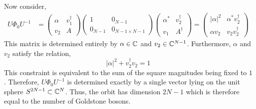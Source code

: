 \documentclass[12pt]{article}
\begin{document}
Now consider,
\begin{align*}
U \Phi_0 U^{-1} & =
\begin{pmatrix}
\alpha & v_1^\dagger 
\\
v_2 & A
\end{pmatrix}
\begin{pmatrix}
1 & 0_{N-1}
\\
0_{N-1} & 0_{N-1 \times N-1}
\end{pmatrix}
\begin{pmatrix}
\alpha^* & v_2^\dagger 
\\
v_1 & A^\dagger
\end{pmatrix}
= 
\begin{pmatrix}
|\alpha|^2 & \alpha^* v_2^\dagger
\\
\alpha v_2 & v_2 v_2^\dagger 
\end{pmatrix}
\end{align*} 
This matrix is determined entirely by $\alpha \in \mathbb{C}$ and $v_2 \in \mathbb{C}^{N-1}$. Furthermore, $\alpha$ and $v_2$ satisfy the relation,
\[ |\alpha|^2 + v_2^\dagger v_2 = 1 \]
This constraint is equivalent to the sum of the square magnitudes being fixed to $1$. Therefore, $U \Phi_0 U^{-1}$ is determined exactly by a single vector lying on the unit sphere $S^{2N-1} \subset \mathbb{C}^{N}$. Thus, the orbit has dimension $2N - 1$ which is therefore equal to the number of Goldstone bosons.   
\end{document}
